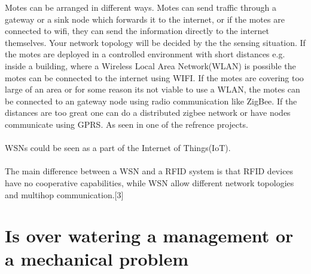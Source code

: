 \documentclass[]{uiophd}
\begin{document}
Motes can be arranged in different ways. Motes can send traffic through a gateway or a sink node which forwards it to the internet, or if the motes are connected to wifi, they can send the information directly to the internet themselves. Your network topology will be decided by the the sensing situation. If the motes are deployed in a controlled environment with short distances e.g. inside a building, where a Wireless Local Area Network(WLAN) is possible the motes can be connected to the internet using WIFI. If the motes are covering too large of an area or for some reason its not viable to use a WLAN, the motes can be connected to an gateway node using radio communication like ZigBee. If the distances are too great one can do a distributed zigbee network or have nodes communicate using GPRS. As seen in one of the refrence projects.
\\\\
WSNs could be seen as a part of the Internet of Things(IoT).
\\\\
The main difference between a WSN and a RFID system is that RFID devices have no cooperative capabilities, while WSN allow different network topologies and multihop communication.[3]


\section{Is over watering a management or a mechanical problem}
\end{document}
